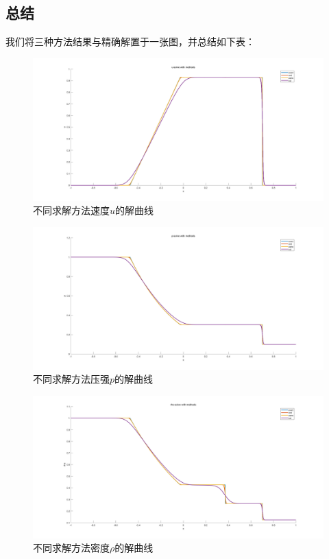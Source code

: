 \documentclass[12pt,a4paper]{article}%
\begin{document}
		\subsection{总结}
		我们将三种方法结果与精确解置于一张图，并总结如下表：
		\begin{figure}[H]
			\centering
			\begin{minipage}{0.83\textwidth}
				\centering
				\includegraphics[width=\textwidth]{./fig/u-2.png}
				\caption{\fontsize{10pt}{15pt}\selectfont 不同求解方法速度$u$的解曲线}
			\end{minipage}
		\end{figure}
		\begin{figure}[H]
			\centering
			\begin{minipage}{0.83\textwidth}
				\centering
				\includegraphics[width=\textwidth]{./fig/p-2.png}
				\caption{\fontsize{10pt}{15pt}\selectfont 不同求解方法压强$p$的解曲线}
			\end{minipage}
		\end{figure}
		\begin{figure}[H]
			\centering
			\begin{minipage}{0.83\textwidth}
				\centering
				\includegraphics[width=\textwidth]{./fig/rho-2.png}
				\caption{\fontsize{10pt}{15pt}\selectfont 不同求解方法密度$\rho$的解曲线}
			\end{minipage}
		\end{figure}
\end{document}
